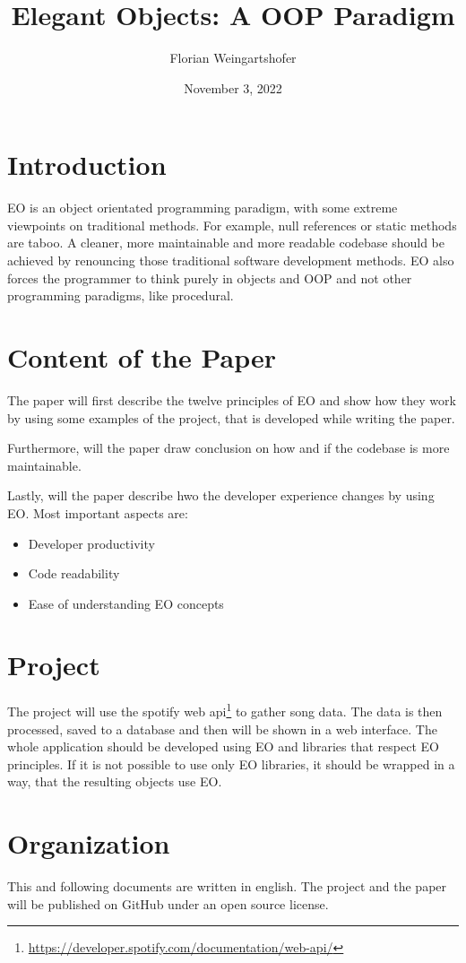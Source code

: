 \documentclass[11pt]{article}
\title{Elegant Objects: A OOP Paradigm}
\author{Florian Weingartshofer}
\date{November 3, 2022}
\begin{document}
    \maketitle


    \section{Introduction}\label{sec:motivation}
    \Gls{EO} is an object orientated programming paradigm, with some extreme viewpoints on traditional methods.
    For example, null references or static methods are taboo.
    A cleaner, more maintainable and more readable codebase should be achieved by renouncing those traditional software development methods.
    \Gls{EO} also forces the programmer to think purely in objects and \gls{OOP} and not other programming paradigms, like procedural.



    \section{Content of the Paper}\label{sec:content-of-the-paper}
    The paper will first describe the twelve principles of \gls{EO} and show how they work by using some examples of the project, that is developed while writing the paper.

    Furthermore, will the paper draw conclusion on how and if the codebase is more maintainable.

    Lastly, will the paper describe hwo the developer experience changes by using \gls{EO}.
    Most important aspects are:
    \begin{itemize}
        \item Developer productivity
        \item Code readability
        \item Ease of understanding \gls{EO} concepts
    \end{itemize}


    \section{Project}\label{sec:project}
    The project will use the spotify web api\footnote{\url{https://developer.spotify.com/documentation/web-api/}} to gather song data.
    The data is then processed, saved to a database and then will be shown in a web interface.
    The whole application should be developed using \gls{EO} and libraries that respect EO principles.
    If it is not possible to use only EO libraries, it should be wrapped in a way, that the resulting objects use \gls{EO}.

    \section{Organization}\label{sec:organization}
    This and following documents are written in english.
    The project and the paper will be published on GitHub under an open source license.

    \printglossary
\end{document}
